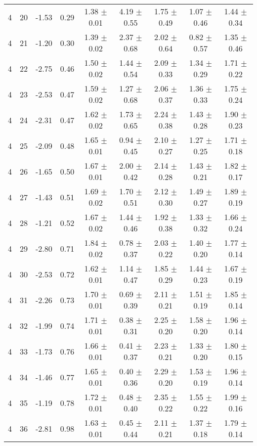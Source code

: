 \begin{landscape}
\begin{longtable}{ccccccccc}
   4 & 20 & -1.53 & 0.29 & 1.38 $\pm$ 0.01 & 4.19 $\pm$ 0.55 & 1.75 $\pm$ 0.49 & 1.07 $\pm$ 0.46 & 1.44 $\pm$ 0.34\\
   4 & 21 & -1.20 & 0.30 & 1.39 $\pm$ 0.02 & 2.37 $\pm$ 0.68 & 2.02 $\pm$ 0.64 & 0.82 $\pm$ 0.57 & 1.35 $\pm$ 0.46\\
   4 & 22 & -2.75 & 0.46 & 1.50 $\pm$ 0.02 & 1.44 $\pm$ 0.54 & 2.09 $\pm$ 0.33 & 1.34 $\pm$ 0.29 & 1.71 $\pm$ 0.22\\
   4 & 23 & -2.53 & 0.47 & 1.59 $\pm$ 0.02 & 1.27 $\pm$ 0.68 & 2.06 $\pm$ 0.37 & 1.36 $\pm$ 0.33 & 1.75 $\pm$ 0.24\\
   4 & 24 & -2.31 & 0.47 & 1.62 $\pm$ 0.02 & 1.73 $\pm$ 0.65 & 2.24 $\pm$ 0.38 & 1.43 $\pm$ 0.28 & 1.90 $\pm$ 0.23\\
   4 & 25 & -2.09 & 0.48 & 1.65 $\pm$ 0.01 & 0.94 $\pm$ 0.45 & 2.10 $\pm$ 0.27 & 1.27 $\pm$ 0.25 & 1.71 $\pm$ 0.18\\
   4 & 26 & -1.65 & 0.50 & 1.67 $\pm$ 0.01 & 2.00 $\pm$ 0.42 & 2.14 $\pm$ 0.28 & 1.43 $\pm$ 0.21 & 1.82 $\pm$ 0.17\\
   4 & 27 & -1.43 & 0.51 & 1.69 $\pm$ 0.02 & 1.70 $\pm$ 0.51 & 2.12 $\pm$ 0.30 & 1.49 $\pm$ 0.27 & 1.89 $\pm$ 0.19\\
   4 & 28 & -1.21 & 0.52 & 1.67 $\pm$ 0.02 & 1.44 $\pm$ 0.46 & 1.92 $\pm$ 0.38 & 1.33 $\pm$ 0.32 & 1.66 $\pm$ 0.24\\
   4 & 29 & -2.80 & 0.71 & 1.84 $\pm$ 0.02 & 0.78 $\pm$ 0.37 & 2.03 $\pm$ 0.22 & 1.40 $\pm$ 0.20 & 1.77 $\pm$ 0.14\\
   4 & 30 & -2.53 & 0.72 & 1.62 $\pm$ 0.01 & 1.14 $\pm$ 0.47 & 1.85 $\pm$ 0.29 & 1.44 $\pm$ 0.23 & 1.67 $\pm$ 0.19\\
   4 & 31 & -2.26 & 0.73 & 1.70 $\pm$ 0.01 & 0.69 $\pm$ 0.39 & 2.11 $\pm$ 0.21 & 1.51 $\pm$ 0.19 & 1.85 $\pm$ 0.14\\
   4 & 32 & -1.99 & 0.74 & 1.71 $\pm$ 0.01 & 0.38 $\pm$ 0.31 & 2.25 $\pm$ 0.20 & 1.58 $\pm$ 0.20 & 1.96 $\pm$ 0.14\\
   4 & 33 & -1.73 & 0.76 & 1.66 $\pm$ 0.01 & 0.41 $\pm$ 0.37 & 2.23 $\pm$ 0.21 & 1.33 $\pm$ 0.20 & 1.80 $\pm$ 0.15\\
   4 & 34 & -1.46 & 0.77 & 1.65 $\pm$ 0.01 & 0.40 $\pm$ 0.36 & 2.29 $\pm$ 0.20 & 1.53 $\pm$ 0.19 & 1.96 $\pm$ 0.14\\
   4 & 35 & -1.19 & 0.78 & 1.72 $\pm$ 0.01 & 0.48 $\pm$ 0.40 & 2.35 $\pm$ 0.22 & 1.55 $\pm$ 0.22 & 1.99 $\pm$ 0.16\\
   4 & 36 & -2.81 & 0.98 & 1.63 $\pm$ 0.01 & 0.45 $\pm$ 0.44 & 2.11 $\pm$ 0.21 & 1.37 $\pm$ 0.18 & 1.79 $\pm$ 0.14\\

\end{longtable}
\end{landscape}
